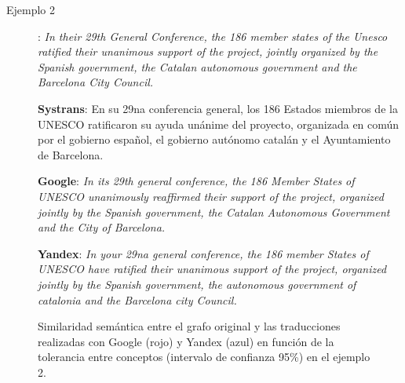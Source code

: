 \documentclass[a4paper,12pt,spanish]{book}
\begin{document}
\begin{description}
\item[{Ejemplo 2}] \leavevmode
: \emph{In their 29th General Conference, the 186 member states of the Unesco ratified their unanimous support of the project, jointly organized by the Spanish government, the Catalan autonomous government and the Barcelona City Council.}

\textbf{Systrans}: En su 29na conferencia general, los 186 Estados miembros de la UNESCO ratificaron su ayuda unánime del proyecto, organizada en común por el gobierno español, el gobierno autónomo catalán y el Ayuntamiento de Barcelona.

\textbf{Google}: \emph{In its 29th general conference, the 186 Member States of UNESCO unanimously reaffirmed their support of the project, organized jointly by the Spanish government, the Catalan Autonomous Government and the City of Barcelona.}

\textbf{Yandex}: \emph{In your 29na general conference, the 186 member States of UNESCO have ratified their unanimous support of the project, organized jointly by the Spanish government, the autonomous government of catalonia and the Barcelona city Council.}

\end{description}
\begin{figure}[htbp]
\centering
\capstart

\caption{Similaridad semántica entre el grafo original y las traducciones realizadas con Google (rojo) y Yandex (azul) en función de la tolerancia entre conceptos (intervalo de confianza 95\%) en el ejemplo 2.}\label{5.pruebas/index:sample02-relation-tol-0}\end{figure}
\end{document}
